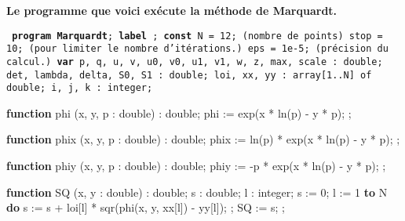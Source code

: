 \null\vskip10mm
{\centerline{\bf Le programme que voici ex\'ecute la m\'ethode de 
Marquardt.} \vskip10mm 
{\obeylines 
{\tt 
{\bf program Marquardt}; 
\medskip 
{\bf label}   
   ; 
\medskip 
 {\bf const} 
   \iA N = 12; \hskip4mm {(\ko nombre de points)} 
   \iA stop = 10; \hskip4mm {(\ko pour limiter le nombre d'it\'erations.)} 
  \iA  eps = 1e-5;  \hskip4mm {(\ko pr\'ecision du calcul.)} 
\medskip 
 {\bf var} 
   \iA p, q, u, v, u0, v0, u1, v1, w, z, max, scale : double; 
   \iA det, lambda, delta, S0, S1 : double; 
   \iA loi, xx, yy : array[1..N] of double; 
   \iA i, j, k : integer; 
 
\medskip 
\filbreak 
\vskip-12pt 
 {\bf function} phi (x, y, p : double) : double;      
 \smallskip 
  \iA  phi := exp(x * ln(p) - y * p); 
  ; 
 
\medskip 
\filbreak 
\vskip-12pt 
 {\bf function} phix (x, y, p : double) : double; 
\smallskip 
  \iA phix := ln(p) * exp(x * ln(p) - y * p); 
  ; 
 
\medskip 
\filbreak 
\vskip-12pt 
{\bf  function} phiy (x, y, p : double) : double; 
\smallskip 
  \iA phiy := -p * exp(x * ln(p) - y * p); 
  ; 
 
\vskip5mm 
 
\medskip 
\filbreak 
\vskip-12pt 
 {\bf function} SQ (x, y : double) : double; 
\smallskip 
    \iB s : double; 
    \iB l : integer; 
\smallskip 
  \iA s := 0; 
   l := 1 {\bf to} N {\bf do} 
    \iB  s := s + loi[l] * sqr(phi(x, y, xx[l]) - yy[l]); 
    ; 
  \iA SQ := s; 
  ; 
 
}}}

